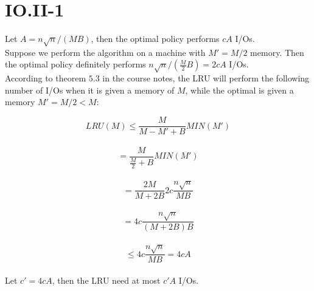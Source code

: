 \section*{IO.II-1}
Let $A = n\sqrt{n} / (M B)$, then the optimal policy performs $cA$ I/Os.\\

Suppose we perform the algorithm on a machine with $M' = M / 2$ memory. Then the optimal policy definitely performs $n\sqrt{n} / (\frac{M}{2} B) = 2cA$ I/Os. \\

According to theorem $5.3$ in the course notes, the LRU will perform the following number of I/Os when it is given a memory of $M$, while the optimal is given a memory $M' = M / 2 < M$:

$$LRU(M) \leq \frac{M}{M - M' + B} MIN(M')$$ \\
$$= \frac{M}{\frac{M}{2} + B} MIN(M')$$ \\ 
$$= \frac{2M}{M + 2B}2c\frac{n\sqrt{n}}{MB}$$ \\
$$= 4c\frac{n\sqrt{n}}{(M + 2B)B}$$ \\
$$\leq 4c\frac{n\sqrt{n}}{MB} = 4cA$$ \\ 

Let $c' = 4cA$, then the LRU need at most $c'A$ I/Os.
